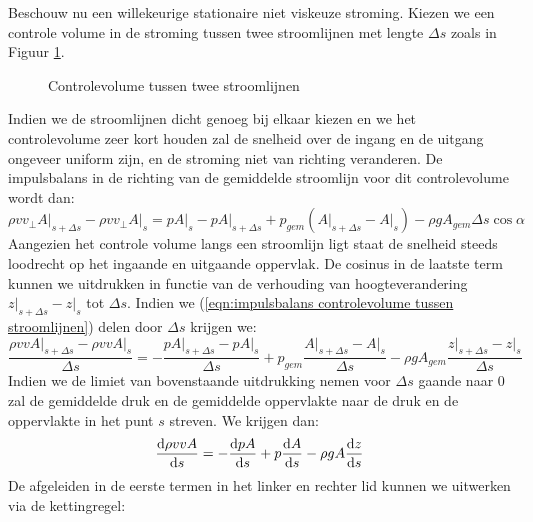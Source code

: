 Beschouw nu een willekeurige stationaire niet viskeuze stroming. Kiezen we een controle volume in de stroming tussen twee stroomlijnen met lengte $\Delta s$ zoals in Figuur \ref{fig:controlevolume tussen stroomlijnen}.
\begin{figure}[htb]
	\centering
	
	\caption{Controlevolume tussen twee stroomlijnen}
	\label{fig:controlevolume tussen stroomlijnen}
\end{figure}
Indien we de stroomlijnen dicht genoeg bij elkaar kiezen en we het controlevolume zeer kort houden zal de snelheid over de ingang en de uitgang ongeveer uniform zijn, en de stroming niet van richting veranderen. De impulsbalans in de richting van de gemiddelde stroomlijn voor dit controlevolume wordt dan:
\begin{equation}
	\left. \rho v v_{\perp} A \right|_{s+\Delta s} - \left. \rho v v_{\perp} A \right|_{s} = \left. p A \right|_{s} - \left. p A \right|_{s+\Delta s} + p_{gem} (\left. A \right|_{s+\Delta s}-\left. A \right|_{s}) -\rho g A_{gem} \Delta s \cos \alpha
	\label{eqn:impulsbalans controlevolume tussen stroomlijnen}
\end{equation}
Aangezien het controle volume langs een stroomlijn ligt staat de snelheid steeds loodrecht op het ingaande en uitgaande oppervlak. De cosinus in de laatste term kunnen we uitdrukken in functie van de verhouding van hoogteverandering $\left. z\right|_{s+\Delta s} - \left. z\right|_{s}$ tot $\Delta s$. Indien we (\ref{eqn:impulsbalans controlevolume tussen stroomlijnen}) delen door $\Delta s$ krijgen we:
\begin{equation}
	\frac{\left. \rho v v A \right|_{s+\Delta s} - \left. \rho v v A \right|_{s}}{\Delta s} = -\frac{\left. p A \right|_{s+\Delta s} - \left. p A \right|_{s}}{\Delta s} + p_{gem} \frac{\left. A \right|_{s+\Delta s}-\left. A \right|_{s}}{\Delta s} -\rho g A_{gem} \frac{\left. z\right|_{s+\Delta s} - \left. z\right|_{s}}{\Delta s}
\end{equation}
Indien we de limiet van bovenstaande uitdrukking nemen voor $\Delta s$ gaande naar $0$ zal de gemiddelde druk en de gemiddelde oppervlakte naar de druk en de oppervlakte in het punt $s$ streven. We krijgen dan:
\begin{equation}
	\frac{\mathrm{d} \rho v v A}{\mathrm{d} s} = -\frac{\mathrm{d} p A}{\mathrm{d} s} + p \frac{\mathrm{d} A}{\mathrm{d} s} -\rho g A \frac{\mathrm{d} z}{\mathrm{d} s}
\end{equation}
De afgeleiden in de eerste termen in het linker en rechter lid kunnen we uitwerken via de kettingregel:
